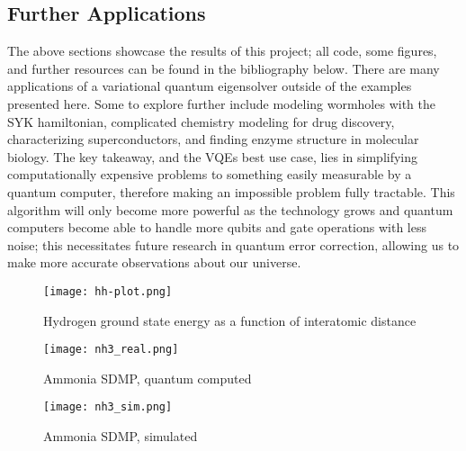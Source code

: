 \documentclass[10pt,twocolumn,letterpaper]{article}
\begin{document}
\subsection{Further Applications}
The above sections showcase the results of this project; all code, some figures, and further resources can be found in the bibliography below. There are many applications of a variational quantum eigensolver outside of the examples presented here. Some to explore further include modeling wormholes with the SYK hamiltonian, complicated chemistry modeling for drug discovery, characterizing superconductors, and finding enzyme structure in molecular biology. The key takeaway, and the VQEs best use case, lies in simplifying computationally expensive problems to something easily measurable by a quantum computer, therefore making an impossible problem fully tractable. This algorithm will only become more powerful as the technology grows and quantum computers become able to handle more qubits and gate operations with less noise; this necessitates future research in quantum error correction, allowing us to make more accurate observations about our universe. 

\begin{figure*}[t]
    \begin{minipage}{0.5\textwidth}
        \texttt{[image: hh-plot.png]}
        \caption{Hydrogen ground state energy as a function of interatomic distance}
        \label{2}
    \end{minipage}
    \begin{minipage}{0.5\textwidth}
        \texttt{[image: nh3\_real.png]}
        \caption{Ammonia SDMP, quantum computed}
        \label{3}
    \end{minipage}
\end{figure*}
\begin{figure*}[!]
    \texttt{[image: nh3\_sim.png]}
        \caption{Ammonia SDMP, simulated}
        \label{4}
\end{figure*}

\newpage



\nocite{*}
\end{document}
